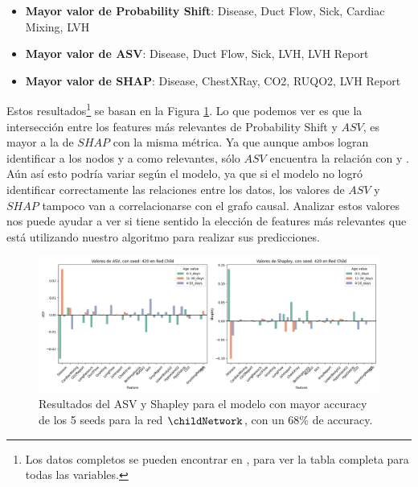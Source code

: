 \begin{itemize}
	\item \textbf{Mayor valor de Probability Shift}: Disease, Duct Flow, Sick, Cardiac Mixing, LVH
	\item \textbf{Mayor valor de ASV}: Disease, Duct Flow, Sick, LVH, LVH Report
	\item \textbf{Mayor valor de SHAP}: Disease, ChestXRay, CO2, RUQO2, LVH Report
\end{itemize}

Estos resultados\footnote{Los datos completos se pueden encontrar en , para ver la tabla completa para todas las variables.} se basan en la Figura \ref{fig:shapleyVsASVSingleSeedChild}. Lo que podemos ver es que la intersección entre los features más relevantes de Probability Shift y $ASV$, es mayor a la de $SHAP$ con la misma métrica. Ya que aunque ambos logran identificar a los nodos  y a  como relevantes, sólo $ASV$ encuentra la relación con  y . Aún así esto podría variar según el modelo, ya que si el modelo no logró identificar correctamente las relaciones entre los datos, los valores de $ASV$ y $SHAP$ tampoco van a correlacionarse con el grafo causal. Analizar estos valores nos puede ayudar a ver si tiene sentido la elección de features más relevantes que está utilizando nuestro algoritmo para realizar sus predicciones. 

\begin{figure}
	\centering
	\includegraphics[width=1\linewidth]{img/asvResults/childASVAndShapleyExactASVAndShapley.png}
	\caption{Resultados del ASV y Shapley para el modelo con mayor accuracy de los 5 seeds para la red $\childNetwork$, con un 68\% de accuracy. }
	\label{fig:shapleyVsASVSingleSeedChild}
\end{figure}


